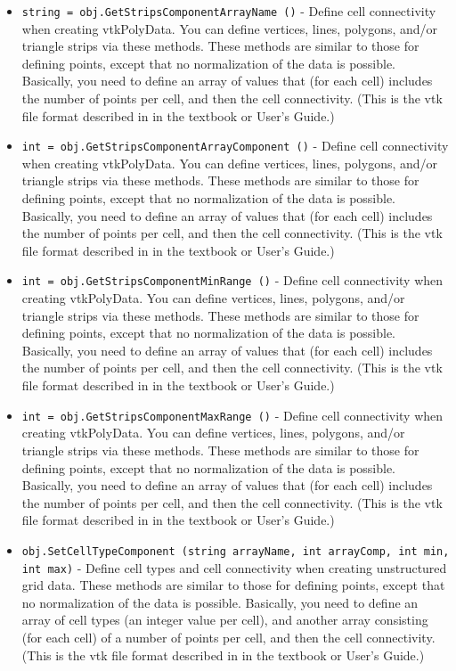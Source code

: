 \begin{itemize}
\item  \verb|string = obj.GetStripsComponentArrayName ()| -  Define cell connectivity when creating vtkPolyData. You can define
 vertices, lines, polygons, and/or triangle strips via these methods.
 These methods are similar to those for defining points, except
 that no normalization of the data is possible. Basically, you need to
 define an array of values that (for each cell) includes the number of 
 points per cell, and then the cell connectivity. (This is the vtk file 
 format described in in the textbook or User's Guide.)

\item  \verb|int = obj.GetStripsComponentArrayComponent ()| -  Define cell connectivity when creating vtkPolyData. You can define
 vertices, lines, polygons, and/or triangle strips via these methods.
 These methods are similar to those for defining points, except
 that no normalization of the data is possible. Basically, you need to
 define an array of values that (for each cell) includes the number of 
 points per cell, and then the cell connectivity. (This is the vtk file 
 format described in in the textbook or User's Guide.)

\item  \verb|int = obj.GetStripsComponentMinRange ()| -  Define cell connectivity when creating vtkPolyData. You can define
 vertices, lines, polygons, and/or triangle strips via these methods.
 These methods are similar to those for defining points, except
 that no normalization of the data is possible. Basically, you need to
 define an array of values that (for each cell) includes the number of 
 points per cell, and then the cell connectivity. (This is the vtk file 
 format described in in the textbook or User's Guide.)

\item  \verb|int = obj.GetStripsComponentMaxRange ()| -  Define cell connectivity when creating vtkPolyData. You can define
 vertices, lines, polygons, and/or triangle strips via these methods.
 These methods are similar to those for defining points, except
 that no normalization of the data is possible. Basically, you need to
 define an array of values that (for each cell) includes the number of 
 points per cell, and then the cell connectivity. (This is the vtk file 
 format described in in the textbook or User's Guide.)

\item  \verb|obj.SetCellTypeComponent (string arrayName, int arrayComp, int min, int max)| -  Define cell types and cell connectivity when creating unstructured grid
 data.  These methods are similar to those for defining points, except
 that no normalization of the data is possible. Basically, you need to
 define an array of cell types (an integer value per cell), and another
 array consisting (for each cell) of a number of points per cell, and
 then the cell connectivity. (This is the vtk file format described in 
 in the textbook or User's Guide.)


\end{itemize}
